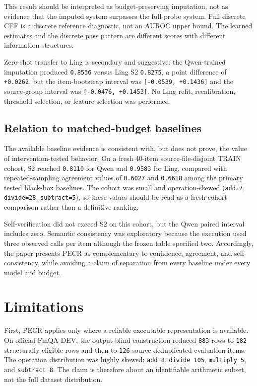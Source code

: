 \documentclass[11pt]{article}
\begin{document}
This result should be interpreted as budget-preserving imputation, not as evidence that the imputed system surpasses the full-probe system. Full discrete CEF is a discrete reference diagnostic, not an AUROC upper bound. The learned estimates and the discrete pass pattern are different scores with different information structures.

Zero-shot transfer to Ling is secondary and suggestive: the Qwen-trained imputation produced \texttt{0.8536} versus Ling S2 \texttt{0.8275}, a point difference of \texttt{+0.0262}, but the item-bootstrap interval was \texttt{[-0.0539, +0.1436]} and the source-group interval was \texttt{[-0.0476, +0.1453]}. No Ling refit, recalibration, threshold selection, or feature selection was performed.

\subsection{Relation to matched-budget baselines}

The available baseline evidence is consistent with, but does not prove, the value of intervention-tested behavior. On a fresh 40-item source-file-disjoint TRAIN cohort, S2 reached \texttt{0.8110} for Qwen and \texttt{0.9583} for Ling, compared with repeated-sampling agreement values of \texttt{0.6027} and \texttt{0.6618} among the primary tested black-box baselines. The cohort was small and operation-skewed (\texttt{add=7}, \texttt{divide=28}, \texttt{subtract=5}), so these values should be read as a fresh-cohort comparison rather than a definitive ranking.

Self-verification did not exceed S2 on this cohort, but the Qwen paired interval includes zero. Semantic consistency was exploratory because the execution used three observed calls per item although the frozen table specified two. Accordingly, the paper presents PECR as complementary to confidence, agreement, and self-consistency, while avoiding a claim of separation from every baseline under every model and budget.

\section{Limitations}

First, PECR applies only where a reliable executable representation is available. On official FinQA DEV, the output-blind construction reduced \texttt{883} rows to \texttt{182} structurally eligible rows and then to \texttt{126} source-deduplicated evaluation items. The operation distribution was highly skewed: \texttt{add 8}, \texttt{divide 105}, \texttt{multiply 5}, and \texttt{subtract 8}. The claim is therefore about an identifiable arithmetic subset, not the full dataset distribution.
\end{document}
